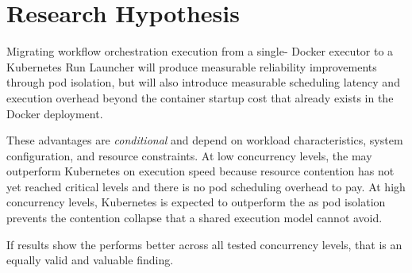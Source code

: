 \section{Research Hypothesis}

Migrating workflow orchestration execution from a single-\vm{} Docker executor to a
Kubernetes Run Launcher will produce measurable reliability improvements through pod
isolation, but will also introduce measurable scheduling latency and execution overhead
beyond the container startup cost that already exists in the \vm{} Docker deployment.

These advantages are \textit{conditional} and depend on workload characteristics, system
configuration, and resource constraints. At low concurrency levels, the \vm{} may outperform
Kubernetes on execution speed because resource contention has not yet reached critical levels
and there is no pod scheduling overhead to pay. At high concurrency levels, Kubernetes is
expected to outperform the \vm{} as pod isolation prevents the contention collapse that a
shared execution model cannot avoid.

If results show the \vm{} performs better across all tested concurrency levels, that is an
equally valid and valuable finding.
